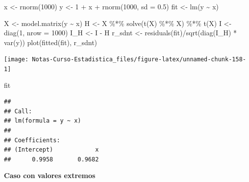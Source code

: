 \documentclass[
  12pt,
]{book}
\newenvironment{Shaded}{\begin{snugshade}}{\end{snugshade}}
\newcommand{\AttributeTok}[1]{\textcolor[rgb]{0.77,0.63,0.00}{#1}}
\newcommand{\DecValTok}[1]{\textcolor[rgb]{0.00,0.00,0.81}{#1}}
\newcommand{\FloatTok}[1]{\textcolor[rgb]{0.00,0.00,0.81}{#1}}
\newcommand{\FunctionTok}[1]{\textcolor[rgb]{0.00,0.00,0.00}{#1}}
\newcommand{\NormalTok}[1]{#1}
\newcommand{\OtherTok}[1]{\textcolor[rgb]{0.56,0.35,0.01}{#1}}
\newcommand{\SpecialCharTok}[1]{\textcolor[rgb]{0.00,0.00,0.00}{#1}}
\theoremstyle{definition}
\theoremstyle{definition}
\theoremstyle{definition}
\theoremstyle{definition}
\theoremstyle{remark}
\begin{document}
\begin{Shaded}
\begin{Highlighting}[]
\NormalTok{x }\OtherTok{\textless{}{-}} \FunctionTok{rnorm}\NormalTok{(}\DecValTok{1000}\NormalTok{)}
\NormalTok{y }\OtherTok{\textless{}{-}} \DecValTok{1} \SpecialCharTok{+}\NormalTok{ x }\SpecialCharTok{+} \FunctionTok{rnorm}\NormalTok{(}\DecValTok{1000}\NormalTok{, }\AttributeTok{sd =} \FloatTok{0.5}\NormalTok{)}
\NormalTok{fit }\OtherTok{\textless{}{-}} \FunctionTok{lm}\NormalTok{(y }\SpecialCharTok{\textasciitilde{}}\NormalTok{ x)}

\NormalTok{X }\OtherTok{\textless{}{-}} \FunctionTok{model.matrix}\NormalTok{(y }\SpecialCharTok{\textasciitilde{}}\NormalTok{ x)}
\NormalTok{H }\OtherTok{\textless{}{-}}\NormalTok{ X }\SpecialCharTok{\%*\%} \FunctionTok{solve}\NormalTok{(}\FunctionTok{t}\NormalTok{(X) }\SpecialCharTok{\%*\%}\NormalTok{ X) }\SpecialCharTok{\%*\%} \FunctionTok{t}\NormalTok{(X)}
\NormalTok{I }\OtherTok{\textless{}{-}} \FunctionTok{diag}\NormalTok{(}\DecValTok{1}\NormalTok{, }\AttributeTok{nrow =} \DecValTok{1000}\NormalTok{)}
\NormalTok{I\_H }\OtherTok{\textless{}{-}}\NormalTok{ I }\SpecialCharTok{{-}}\NormalTok{ H}
\NormalTok{r\_sdnt }\OtherTok{\textless{}{-}} \FunctionTok{residuals}\NormalTok{(fit)}\SpecialCharTok{/}\FunctionTok{sqrt}\NormalTok{(}\FunctionTok{diag}\NormalTok{(I\_H) }\SpecialCharTok{*} \FunctionTok{var}\NormalTok{(y))}
\FunctionTok{plot}\NormalTok{(}\FunctionTok{fitted}\NormalTok{(fit), r\_sdnt)}
\end{Highlighting}
\end{Shaded}

\begin{center}\texttt{[image: Notas-Curso-Estadistica\_files/figure-latex/unnamed-chunk-158-1]} \end{center}

\begin{Shaded}
\begin{Highlighting}[]
\NormalTok{fit}
\end{Highlighting}
\end{Shaded}

\begin{verbatim}
## 
## Call:
## lm(formula = y ~ x)
## 
## Coefficients:
## (Intercept)            x  
##      0.9958       0.9682
\end{verbatim}

\textbf{Caso con valores extremos}
\end{document}
